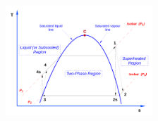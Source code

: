 \documentclass[10pt,compress]{beamer}
\begin{document}
\begin{frame}
\begin{columns}
\begin{column}[c]{0.5\linewidth}
{           \vspace{-0.1cm}
           \hbox{\hspace{.5cm}\includegraphics[width=5.5cm,clip]{./Pics/Ideal_Real_Rankine}}
         }
      \end{column}
   \end{columns}
 \normalsize
\end{frame}

\end{document}
